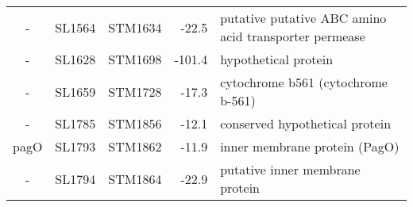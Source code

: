 \begin{table}
\begin{tabular}{ c
    				c
				c
				r
				l
				}
    -     & SL1564 & STM1634 & -22.5 & putative putative ABC amino acid transporter permease \\
    -     & SL1628 & STM1698 & -101.4 & hypothetical protein \\
    -     & SL1659 & STM1728 & -17.3 & cytochrome b561 (cytochrome b-561) \\
    -     & SL1785 & STM1856 & -12.1 & conserved hypothetical protein \\
    pagO  & SL1793 & STM1862 & -11.9 & inner membrane protein (PagO) \\
    -     & SL1794 & STM1864 & -22.9 & putative inner membrane protein \\
    \bottomrule
    \end{tabular}%
    \label{tab:core}%
\end{table}

